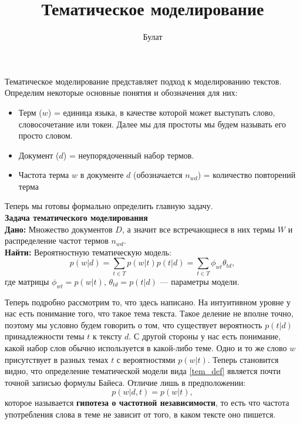\documentclass[a4paper, 12pt]{article}
\author{Булат}
\title{Тематическое моделирование}
\begin{document}
\maketitle
Тематическое моделирование представляет подход к моделированию текстов. Определим некоторые основные понятия и обозначения для них:
\begin{itemize}
    \item Терм ($w$) = единица языка, в качестве которой может выступать слово, словосочетание или токен. Далее мы для простоты мы будем называть его просто словом.
    \item Документ ($d$) = неупорядоченный набор термов. 
    \item Частота терма $w$ в документе $d$ (обозначается $n_{wd}$) = количество повторений терма
\end{itemize}
Теперь мы готовы формально определить главную задачу.\\
\textbf{Задача тематического моделирования}\\
\textbf{Дано:} Множество документов $D$, а значит все встречающиеся в них термы $W$ и распределение частот термов $n_{wd}$.\\
\textbf{Найти:} Вероятностную тематическую модель:
\begin{equation}\label{tem_def}
    p(w|d) = \sum\limits_{t\in T} p(w|t) p(t|d) = \sum\limits_{t\in T} \phi_{wt} \theta_{td}, 
\end{equation}
где матрицы $\phi_{wt} = p(w|t)$,  $\theta_{td} = p(t|d)$ --- параметры модели.

Теперь подробно рассмотрим то, что здесь написано. На интуитивном уровне у нас есть понимание того, что такое тема текста. Такое деление не вполне точно, поэтому мы условно будем говорить о том, что существует вероятность $p(t|d)$ принадлежности темы $t$ к тексту $d$. С другой стороны у нас есть понимание, какой набор слов обычно используется в какой-либо теме. Одно и то же слово $w$ присутствует в разных темах $t$ с вероятностями $p(w|t)$. Теперь становится видно, что определение тематической модели вида \eqref{tem_def} является почти точной записью формулы Байеса. Отличие лишь в предположении: 
\begin{equation}
    p(w|d,t) = p(w|t), 
\end{equation}
которое называется \textbf{гипотеза о частотной независимости}, то есть что частота употребления слова в теме не зависит от того, в каком тексте оно пишется.
\end{document}
